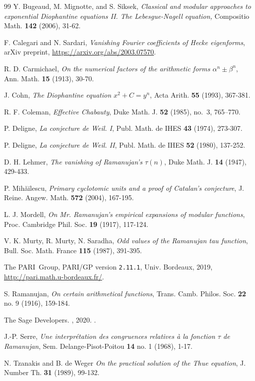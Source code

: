 \documentclass[12pt]{amsart}
\numberwithin{equation}{section}
\begin{document}
\begin{thebibliography}{99}
 Y. Bugeaud, M. Mignotte, and S. Siksek, \emph{Classical and modular approaches to exponential Diophantine equations II. The Lebesgue-Nagell equation,} Compositio Math.
\textbf{142} (2006), 31-62.

 F. Calegari and N. Sardari, \emph{Vanishing Fourier coefficients of Hecke eigenforms},
arXiv preprint, \url{https://arxiv.org/abs/2003.07570}.

 R. D. Carmichael, \emph{On the numerical factors of the arithmetic forms
$\alpha^n\pm \beta^n$}, Ann. Math. \textbf{15} (1913), 30-70.


 J. Cohn, \emph{The Diophantine equation $x^2+C=y^n$}, Acta Arith.
\textbf{55} (1993), 367-381.

R. F. Coleman, \emph{Effective {C}habauty}, Duke Math. J. \textbf{52} (1985), no.~3,
  765--770.
  
 P. Deligne, \emph{La conjecture de Weil. I}, Publ. Math. de IHES \textbf{43} (1974), 273-307.

 P. Deligne, \emph{La conjecture de Weil. II}, Publ. Math. de IHES \textbf{52} (1980), 137-252.


  
  
 D. H. Lehmer, \emph{The vanishing of Ramanujan's $\tau(n)$}, Duke Math. J.
\textbf{14} (1947), 429-433.


 P. Mih\u{a}ilescu, \emph{Primary cyclotomic units and a proof of Catalan's conjecture},
J. Reine. Angew. Math. \textbf{572} (2004), 167-195.

 L. J. Mordell, \emph{On Mr. Ramanujan's empirical expansions of modular functions},
Proc. Cambridge Phil. Soc. \textbf{19} (1917), 117-124.

 V. K. Murty, R. Murty, N. Saradha, \emph{Odd values of the Ramanujan tau function},
Bull. Soc. Math. France \textbf{115} (1987), 391-395.

    The PARI~Group, PARI/GP version \texttt{2.11.1}, Univ. Bordeaux, 2019,
    \url{http://pari.math.u-bordeaux.fr/}.

 S. Ramanujan, \emph{On certain arithmetical functions}, Trans. Camb. Philos. Soc.
\textbf{22} no. 9 (1916), 159-184.

 {The Sage Developers}. , 2020. .

 J.-P. Serre, \emph{Une interpr\'etation des congruences relatives \`a la fonction $\tau$ de Ramanujan},
Sem. Delange-Pisot-Poitou \textbf{14} no. 1 (1968), 1-17. 

 N. Tzanakis and B. de Weger \emph{On the practical solution of the Thue equation},
J. Number Th. \textbf{31} (1989), 99-132.


\end{thebibliography}
\end{document}
